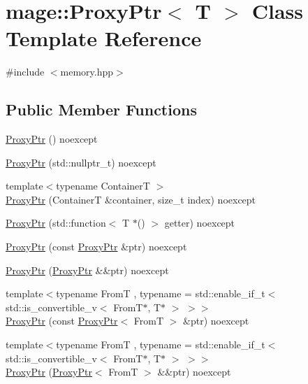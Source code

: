 \hypertarget{classmage_1_1_proxy_ptr}{}\section{mage\+:\+:Proxy\+Ptr$<$ T $>$ Class Template Reference}
\label{classmage_1_1_proxy_ptr}


{\ttfamily \#include $<$memory.\+hpp$>$}

\subsection*{Public Member Functions}
\begin{DoxyCompactItemize}
\item 
\mbox{\hyperlink{classmage_1_1_proxy_ptr_a6fadf61cdc71e1d6bc9ac666eda5d2c6}{Proxy\+Ptr}} () noexcept
\item 
\mbox{\hyperlink{classmage_1_1_proxy_ptr_aaad9140d67d5c0a8694e94973234676a}{Proxy\+Ptr}} (std\+::nullptr\+\_\+t) noexcept
\item 
{\footnotesize template$<$typename ContainerT $>$ }\\\mbox{\hyperlink{classmage_1_1_proxy_ptr_a52d2afaf6a037026a4694a074f21a54f}{Proxy\+Ptr}} (ContainerT \&container, size\+\_\+t index) noexcept
\item 
\mbox{\hyperlink{classmage_1_1_proxy_ptr_a964d48ac831c8c179edca90bdfcc5b0b}{Proxy\+Ptr}} (std\+::function$<$ T $\ast$() $>$ getter) noexcept
\item 
\mbox{\hyperlink{classmage_1_1_proxy_ptr_aa31b385e10ba8ab7ce91791078e9ed6d}{Proxy\+Ptr}} (const \mbox{\hyperlink{classmage_1_1_proxy_ptr}{Proxy\+Ptr}} \&ptr) noexcept
\item 
\mbox{\hyperlink{classmage_1_1_proxy_ptr_a51e4a025cd9ca419a2c4b687b4c430bb}{Proxy\+Ptr}} (\mbox{\hyperlink{classmage_1_1_proxy_ptr}{Proxy\+Ptr}} \&\&ptr) noexcept
\item 
{\footnotesize template$<$typename FromT , typename  = std\+::enable\+\_\+if\+\_\+t$<$ std\+::is\+\_\+convertible\+\_\+v$<$ From\+T$\ast$, T$\ast$ $>$ $>$$>$ }\\\mbox{\hyperlink{classmage_1_1_proxy_ptr_a0356f4ad5f0a6e08baf29bc9239d317c}{Proxy\+Ptr}} (const \mbox{\hyperlink{classmage_1_1_proxy_ptr}{Proxy\+Ptr}}$<$ FromT $>$ \&ptr) noexcept
\item 
{\footnotesize template$<$typename FromT , typename  = std\+::enable\+\_\+if\+\_\+t$<$ std\+::is\+\_\+convertible\+\_\+v$<$ From\+T$\ast$, T$\ast$ $>$ $>$$>$ }\\\mbox{\hyperlink{classmage_1_1_proxy_ptr_aab3e1b95156a5b52b47db4d2f4176e37}{Proxy\+Ptr}} (\mbox{\hyperlink{classmage_1_1_proxy_ptr}{Proxy\+Ptr}}$<$ FromT $>$ \&\&ptr) noexcept

\end{DoxyCompactItemize}
